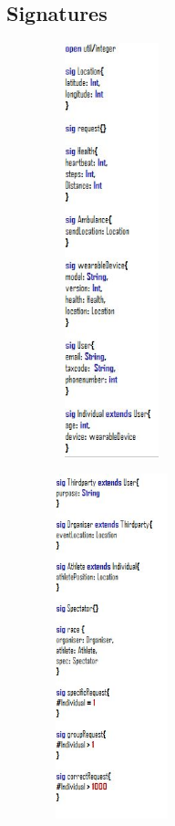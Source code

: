 \subsection{Signatures}
\begin{figure}[H]
	\includegraphics[width=4cm,height=12cm]{./Alloy/sig1.JPG}
\end{figure}
\begin{figure}[H]	\includegraphics[width=4cm,height=10cm]{./Alloy/sig2.JPG}
\end{figure}
